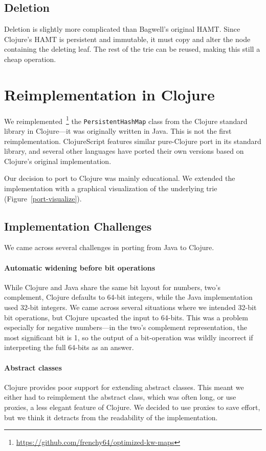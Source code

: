 \documentclass[preprint]{sigplanconf}
\begin{document}
\subsection{Deletion}
Deletion is slightly more complicated than Bagwell's original
HAMT. Since Clojure's HAMT is persistent and immutable, it
must copy and alter the node containing the deleting leaf.
The rest of the trie can be reused, making this still a cheap
operation.

\section{Reimplementation in Clojure}

We reimplemented~\footnote{\url{https://github.com/frenchy64/optimized-kw-maps}}
the \texttt{PersistentHashMap} class from
the Clojure standard library in Clojure---it was originally
written in Java.
This is not the first reimplementation. ClojureScript
features similar pure-Clojure port in its standard library,
and several other languages have ported their own versions
based on Clojure's original implementation.

Our decision to port to Clojure was mainly educational.
We extended the implementation with a graphical visualization
of the underlying trie
(Figure~\ref{port-visualize}).

\subsection{Implementation Challenges}

We came across several challenges in porting from Java to
Clojure.

\paragraph{Automatic widening before bit operations}
While Clojure and Java share the same bit layout
for numbers, two's complement, Clojure
defaults to 64-bit integers, while the Java
implementation used 32-bit integers.
%
We came across several situations
where we intended 32-bit bit operations, but
Clojure upcasted the input to 64-bits. This
was a problem especially for negative numbers---in
the two's complement representation, the most
significant bit is 1, so the output of a bit-operation
was wildly incorrect if interpreting the full
64-bits as an answer.

\paragraph{Abstract classes}
Clojure provides poor support for 
extending abstract classes. This meant
we either had to reimplement the abstract class,
which was often long, or use proxies, a less
elegant feature of Clojure.
%
We decided to use proxies to save effort, but we think it detracts
from the readability of the implementation.
\end{document}
